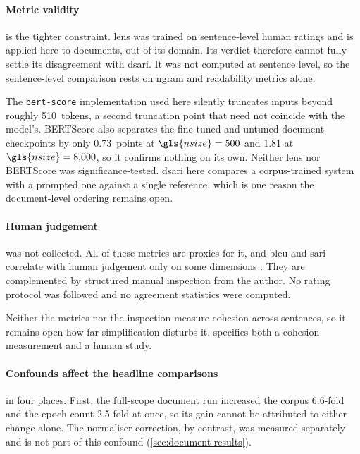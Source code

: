 \paragraph{Metric validity} is the tighter constraint.
\Gls{lens} was trained on sentence-level human ratings \parencite[16385--16386]{maddela-etal-2023-lens} and is applied here to documents, out of its domain.
Its verdict therefore cannot fully settle its disagreement with \gls{dsari}.
It was not computed at sentence level, so the sentence-level comparison rests on \gls{ngram} and readability metrics alone.

\pagebreak

The \texttt{bert-score} implementation used here silently truncates inputs beyond roughly \num{510}~tokens, a second truncation point that need not coincide with the model's.
BERTScore also separates the fine-tuned and untuned document checkpoints by only \num{0.73}~points at \(\gls{nsize} = 500\) and \num{1.81} at \(\gls{nsize} = 8{,}000\), so it confirms nothing on its own.
Neither \gls{lens} nor BERTScore was significance-tested.
\Gls{dsari} here compares a corpus-trained system with a prompted one against a single reference, which is one reason the document-level ordering remains open.

\paragraph{Human judgement} was not collected.
All of these metrics are proxies for it, and \gls{bleu} and \gls{sari} correlate with human judgement only on some dimensions \parencite[148, 150--151]{alva-manchego-etal-2020-survey}.
They are complemented by structured manual inspection from the author.
No rating protocol was followed and no agreement statistics were computed.

Neither the metrics nor the inspection measure cohesion across sentences, so it remains open how far simplification disturbs it.
 specifies both a cohesion measurement and a human study.

\paragraph{Confounds affect the headline comparisons} in four places.
First, the full-scope document run increased the corpus \num{6.6}-fold and the epoch count \num{2.5}-fold at once, so its gain cannot be attributed to either change alone.
The normaliser correction, by contrast, was measured separately and is not part of this confound (\cref{sec:document-results}).

